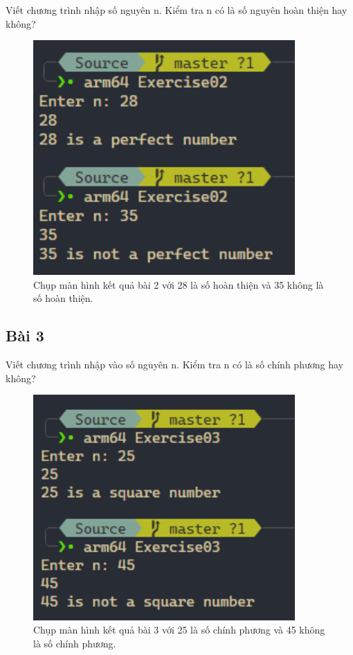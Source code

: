 Viết chương trình nhập số nguyên n. Kiểm tra n có là số nguyên hoàn thiện hay không?

\begin{figure}[H]
	\centering
	\includegraphics[width=10cm]{images/img2.PNG}
	\caption{Chụp màn hình kết quả bài 2 với 28 là số hoàn thiện và 35 không là số hoàn thiện.}
\end{figure}

\subsection{Bài 3}

Viết chương trình nhập vào số nguyên n. Kiểm tra n có là số chính phương hay không?

\begin{figure}[H]
	\centering
	\includegraphics[width=10cm]{images/img3.PNG}
	\caption{Chụp màn hình kết quả bài 3 với 25 là số chính phương và 45 không là số chính phương.}
\end{figure}


